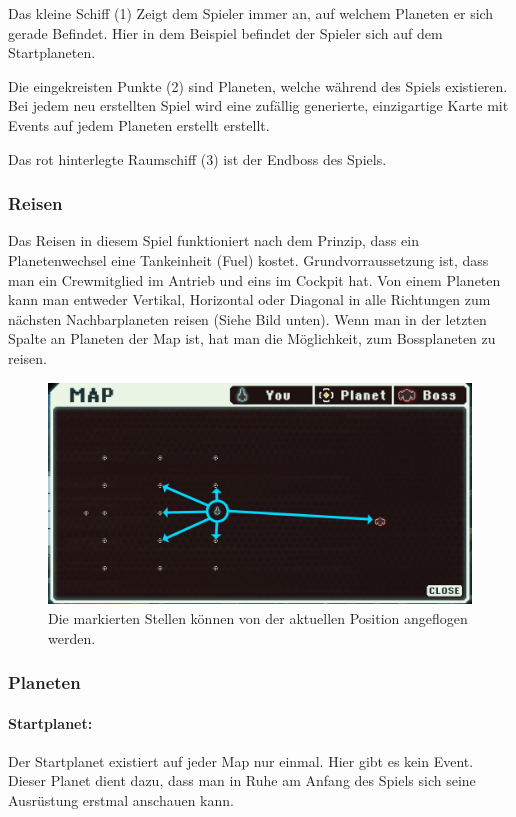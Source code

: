 \documentclass[fontsize=12pt,paper=a4,twoside]{scrartcl}
\begin{document}
Das kleine Schiff (1) Zeigt dem Spieler immer an, auf welchem Planeten er sich gerade Befindet. Hier in dem Beispiel befindet der Spieler sich auf dem Startplaneten. 

Die eingekreisten Punkte (2) sind Planeten, welche während des Spiels existieren. Bei jedem neu erstellten Spiel wird eine zufällig generierte, einzigartige Karte mit Events auf jedem Planeten erstellt erstellt. 

Das rot hinterlegte Raumschiff (3) ist der Endboss des Spiels. 

\subsubsection{Reisen} 

Das Reisen in diesem Spiel funktioniert nach dem Prinzip, dass ein Planetenwechsel eine Tankeinheit (Fuel) kostet. Grundvorraussetzung ist, dass man ein Crewmitglied im Antrieb und eins im Cockpit hat. Von einem Planeten kann man entweder Vertikal, Horizontal oder Diagonal in alle Richtungen zum nächsten Nachbarplaneten reisen (Siehe Bild unten). Wenn man in der letzten Spalte an Planeten der Map ist, hat man die Möglichkeit, zum Bossplaneten zu reisen.

\begin{figure}[H]
\centering
\includegraphics[width=0.8\linewidth]{DasSpiel/Karte/wohinReisen.png}
\caption{Die markierten Stellen können von der aktuellen Position angeflogen werden.}
\end{figure} 




\subsubsection{Planeten}

\paragraph{Startplanet: }
Der Startplanet existiert auf jeder Map nur einmal. Hier gibt es kein Event. Dieser Planet dient dazu, dass man in Ruhe am Anfang des Spiels sich seine Ausrüstung erstmal anschauen kann. 
\end{document}
